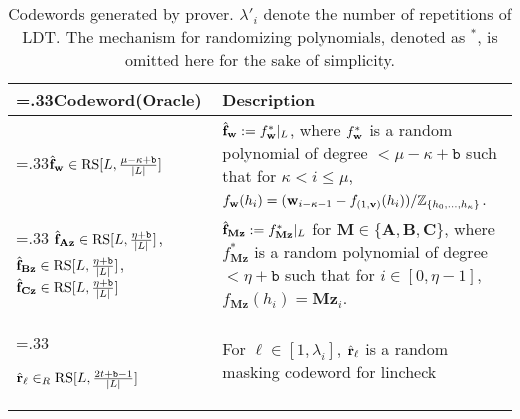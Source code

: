 \begin{table}[]
\centering
\caption[Codewords Generated by the Aurora Prover Algorithm]{Codewords generated by prover. 
$\lambda'_i$ denote the number of repetitions of LDT. The mechanism for randomizing polynomials, denoted as $^*$, is omitted here for the sake of simplicity.}
\label{tab:codewords}
{ 
\begin{tabularx}{\linewidth}{>{\hsize=.33\hsize}XX}
\toprule
\textbf{Codeword(Oracle)} & \textbf{Description} \\
\midrule
$\hat{{\bf{f}}}_{\bf{w}} \in \text{RS}[L, \frac{\mu-\kappa+\texttt{b}}{|L|}]$  & 
{$\hat{{\bf{f}}}_{\bf{w}} := f^*_{\bf{w}}|_L$, where $f^*_{\bf{w}}$ is a random polynomial of degree $< \mu - \kappa +\texttt{b}$ such that for $\kappa < i\leq \mu$, \(f_{{\bf{w}}}(h_i) = ({{\bf{w}}_{i-\kappa-1} - f_{(1,{\bf{v}})}(h_i)})/{\mathbb{Z}_{\{h_0,\dots, h_{\kappa}\}}} \)}.\\     
\midrule
$\hat{{\bf{f}}}_{\mathbf{Az}} \in \text{RS}[L, \frac{\eta+\texttt{b}}{|L|}]$,\newline
$\hat{{\bf{f}}}_{\mathbf{Bz}} \in \text{RS}[L, \frac{\eta+\texttt{b}}{|L|}]$, \newline
$\hat{{\bf{f}}}_{\mathbf{Cz}} \in \text{RS}[L, \frac{\eta+\texttt{b}}{|L|}]$ & 
$\hat{{\bf{f}}}_{\mathbf{Mz}} := f^*_{\mathbf{Mz}}|_L$ for $\mathbf{M} \in \{\mathbf{A}, \mathbf{B}, \mathbf{C}\}$, where $f^*_{\mathbf{Mz}}$ is a random polynomial of degree $< \eta + \texttt{b}$ such that for $i \in [0,\eta-1]$, \(f_{\mathbf{Mz}}(h_i) = \mathbf{Mz}_i\).
\\
\midrule

$\hat{{\bf{r}}}_\ell \in_R  \text{RS}[L, \frac{2t+\texttt{b}-1}{|L|}]$ & For $\ell\in [1,\lambda_i]$, $\hat{{\bf{r}}}_\ell$ is a random masking codeword for lincheck
\\
\midrule


\end{tabularx}}
\end{table}
